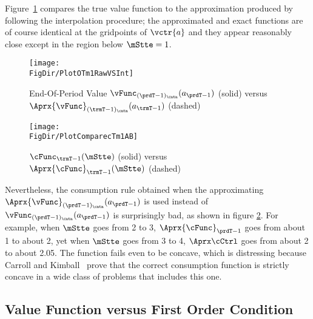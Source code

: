 \documentclass[\econtexRoot/SolvingMicroDSOPs]{subfiles}
\begin{document}
Figure~\ref{fig:PlotOTm1RawVSInt} compares the true value function to the approximation produced by following the interpolation procedure; the approximated and exact functions are of course identical at the gridpoints of $\vctr{a}$ and they appear reasonably close except in the region below $\mStte=1$.

\hypertarget{PlotOTm1RawVSInt}{}
\begin{figure}
  \centerline{\texttt{[image: \\FigDir/PlotOTm1RawVSInt]}}
  \caption{End-Of-Period Value $\vFunc_{({\prdT-1})_\cntn}({a}_{\prdT-1})$ (solid) versus $\Aprx{\vFunc}_{({\trmT-1})_\cntn}({a}_{\trmT-1})$ (dashed)}
  \label{fig:PlotOTm1RawVSInt}
\end{figure}

\hypertarget{PlotComparecTm1AB}{}
\begin{figure}
  \centerline{\texttt{[image: \\FigDir/PlotComparecTm1AB]}}
  \caption{$\cFunc_{\trmT-1}(\mStte)$ (solid) versus $\Aprx{\cFunc}_{\trmT-1}(\mStte)$ (dashed)}
  \label{fig:PlotComparecTm1AB}
\end{figure}


Nevertheless, the consumption rule obtained when the approximating $\Aprx{\vFunc}_{({\prdT-1})_\cntn}({a}_{\prdT-1})$ is used instead of $\vFunc_{({\prdT-1})_\cntn}({a}_{\prdT-1})$ is surprisingly bad, as shown in figure \ref{fig:PlotComparecTm1AB}.  For example, when $\mStte$ goes from 2 to 3, $\Aprx{\cFunc}_{\prdT-1}$ goes from about 1 to about 2, yet when $\mStte$ goes from 3 to 4, $\Aprx\cCtrl$ goes from about 2 to about 2.05.  The function fails even to be concave, which is distressing because Carroll and Kimball~\citeyearpar{ckConcavity} prove that the correct consumption function is strictly concave in a wide class of problems that includes this one.

\hypertarget{value-function-versus-first-order-condition}{}
\subsection{Value Function versus First Order Condition}\label{subsec:vVsuP}
\end{document}
